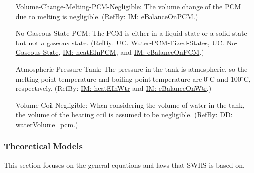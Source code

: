 \documentclass[12pt]{article}
\begin{document}
\begin{itemize}
\item[Volume-Change-Melting-PCM-Negligible:\phantomsection\label{assumpVCMPN}]{The volume change of the PCM due to melting is negligible. (RefBy: \hyperref[IM:eBalanceOnPCM]{IM: eBalanceOnPCM}.)}
\item[No-Gaseous-State-PCM:\phantomsection\label{assumpNGSP}]{The PCM is either in a liquid state or a solid state but not a gaseous state. (RefBy: \hyperref[unlikeChgWPFS]{UC: Water-PCM-Fixed-States}, \hyperref[unlikeChgNGS]{UC: No-Gaseous-State}, \hyperref[IM:heatEInPCM]{IM: heatEInPCM}, and \hyperref[IM:eBalanceOnPCM]{IM: eBalanceOnPCM}.)}
\item[Atmospheric-Pressure-Tank:\phantomsection\label{assumpAPT}]{The pressure in the tank is atmospheric, so the melting point temperature and boiling point temperature are 0${{}^{\circ}\text{C}}$ and 100${{}^{\circ}\text{C}}$, respectively. (RefBy: \hyperref[IM:heatEInWtr]{IM: heatEInWtr} and \hyperref[IM:eBalanceOnWtr]{IM: eBalanceOnWtr}.)}
\item[Volume-Coil-Negligible:\phantomsection\label{assumpVCN}]{When considering the volume of water in the tank, the volume of the heating coil is assumed to be negligible. (RefBy: \hyperref[DD:waterVolume.pcm]{DD: waterVolume\_pcm}.)}
\end{itemize}
\subsubsection{Theoretical Models}
\label{Sec:TMs}
This section focuses on the general equations and laws that SWHS is based on.
\end{document}
